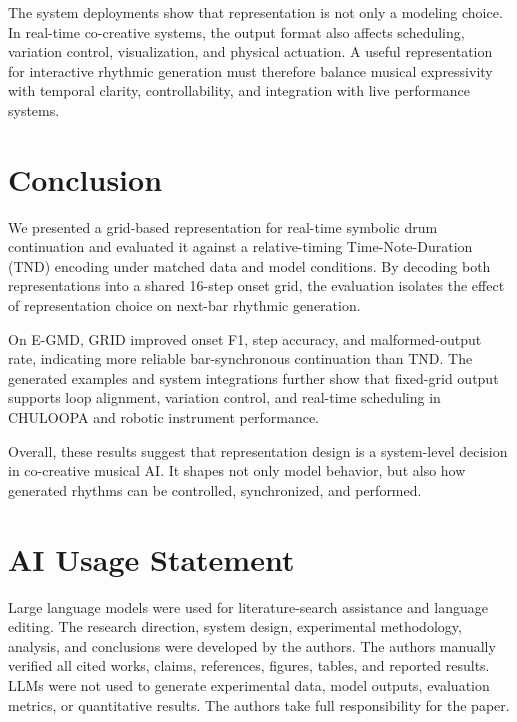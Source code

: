 \documentclass{article}
\begin{document}
The system deployments show that representation is not only a modeling choice. In real-time co-creative systems, the output format also affects scheduling, variation control, visualization, and physical actuation. A useful representation for interactive rhythmic generation must therefore balance musical expressivity with temporal clarity, controllability, and integration with live performance systems.



\section{Conclusion}\label{sec:conclusion}

We presented a grid-based representation for real-time symbolic drum continuation and evaluated it against a relative-timing Time-Note-Duration (TND) encoding under matched data and model conditions. By decoding both representations into a shared 16-step onset grid, the evaluation isolates the effect of representation choice on next-bar rhythmic generation.

On E-GMD, GRID improved onset F1, step accuracy, and malformed-output rate, indicating more reliable bar-synchronous continuation than TND. The generated examples and system integrations further show that fixed-grid output supports loop alignment, variation control, and real-time scheduling in CHULOOPA and robotic instrument performance.

Overall, these results suggest that representation design is a system-level decision in co-creative musical AI. It shapes not only model behavior, but also how generated rhythms can be controlled, synchronized, and performed.


\section{AI Usage Statement}
Large language models were used for literature-search assistance and language editing. The research direction, system design, experimental methodology, analysis, and conclusions were developed by the authors. The authors manually verified all cited works, claims, references, figures, tables, and reported results. LLMs were not used to generate experimental data, model outputs, evaluation metrics, or quantitative results. The authors take full responsibility for the paper.



\end{document}

